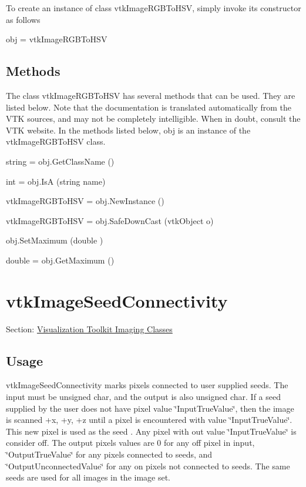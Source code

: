 To create an instance of class vtk\-Image\-R\-G\-B\-To\-H\-S\-V, simply invoke its constructor as follows \begin{DoxyVerb}  obj = vtkImageRGBToHSV
\end{DoxyVerb}
 \hypertarget{vtkwidgets_vtkxyplotwidget_Methods}{}\subsection{Methods}\label{vtkwidgets_vtkxyplotwidget_Methods}
The class vtk\-Image\-R\-G\-B\-To\-H\-S\-V has several methods that can be used. They are listed below. Note that the documentation is translated automatically from the V\-T\-K sources, and may not be completely intelligible. When in doubt, consult the V\-T\-K website. In the methods listed below, {\ttfamily obj} is an instance of the vtk\-Image\-R\-G\-B\-To\-H\-S\-V class. 
\begin{DoxyItemize}
\item {\ttfamily string = obj.\-Get\-Class\-Name ()}  
\item {\ttfamily int = obj.\-Is\-A (string name)}  
\item {\ttfamily vtk\-Image\-R\-G\-B\-To\-H\-S\-V = obj.\-New\-Instance ()}  
\item {\ttfamily vtk\-Image\-R\-G\-B\-To\-H\-S\-V = obj.\-Safe\-Down\-Cast (vtk\-Object o)}  
\item {\ttfamily obj.\-Set\-Maximum (double )}  
\item {\ttfamily double = obj.\-Get\-Maximum ()}  
\end{DoxyItemize}\hypertarget{vtkimaging_vtkimageseedconnectivity}{}\section{vtk\-Image\-Seed\-Connectivity}\label{vtkimaging_vtkimageseedconnectivity}
Section\-: \hyperlink{sec_vtkimaging}{Visualization Toolkit Imaging Classes} \hypertarget{vtkwidgets_vtkxyplotwidget_Usage}{}\subsection{Usage}\label{vtkwidgets_vtkxyplotwidget_Usage}
vtk\-Image\-Seed\-Connectivity marks pixels connected to user supplied seeds. The input must be unsigned char, and the output is also unsigned char. If a seed supplied by the user does not have pixel value \char`\"{}\-Input\-True\-Value\char`\"{}, then the image is scanned +x, +y, +z until a pixel is encountered with value \char`\"{}\-Input\-True\-Value\char`\"{}. This new pixel is used as the seed . Any pixel with out value \char`\"{}\-Input\-True\-Value\char`\"{} is consider off. The output pixels values are 0 for any off pixel in input, \char`\"{}\-Output\-True\-Value\char`\"{} for any pixels connected to seeds, and \char`\"{}\-Output\-Unconnected\-Value\char`\"{} for any on pixels not connected to seeds. The same seeds are used for all images in the image set.

